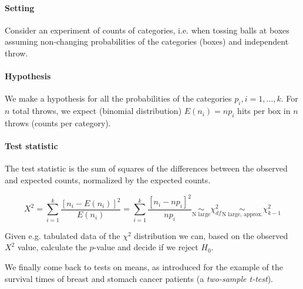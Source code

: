 \paragraph*{Setting} Consider an experiment of counts of categories, i.e. when tossing
balls at boxes assuming non-changing probabilities of the categories (boxes) and
independent throw.

\paragraph*{Hypothesis} We make a hypothesis for all the probabilities of the 
categories $p_i, i=1,\ldots,k$. For $n$ total throws, we expect (binomial distribution)
$E(n_i) = n p_i$ hits per box in $n$ throws (counts per category).

\paragraph*{Test statistic} The test statistic is the sum of squares of the differences
between the observed and expected counts, normalized by the expected counts.

\begin{equation}
    X^2=\sum_{i=1}^k \frac{\left[n_i-E\left(n_i\right)\right]^2}{E\left(n_i\right)}=\sum_{i=1}^k \frac{\left[n_i-n p_i\right]^2}{n p_i} \underset{\text{N large}}{\sim} \chi^2_{df} \underset{\text{N large, approx.}}{\sim} \chi_{k-1}^2
\end{equation}


Given e.g. tabulated data of the $\chi^2$ distribution we can, based on the observed $X^2$ value, calculate the $p$-value and decide if we reject $H_0$.

We finally come back to tests on means, as introduced for the example of the survival times of breast and stomach cancer patients 
(a \textit{two-sample t-test}).

